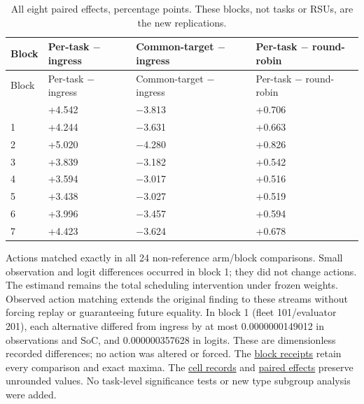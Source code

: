 \documentclass[12pt,a4paper]{article}
\begin{document}
\begingroup
\singlespacing\footnotesize\setlength{\tabcolsep}{3pt}
\renewcommand{\thetable}{E2}
\begin{xltabular}{\textwidth}{@{}YYYY@{}}
\caption[Eight paired effects]{All eight paired effects, percentage points. These blocks, not tasks or RSUs, are the new replications.}\label{tab:E2} \\
\toprule
Block & Per-task \ensuremath{-} ingress & Common-target \ensuremath{-} ingress & Per-task \ensuremath{-} round-robin \\
\midrule\endfirsthead
\toprule
Block & Per-task \ensuremath{-} ingress & Common-target \ensuremath{-} ingress & Per-task \ensuremath{-} round-robin \\
\midrule\endhead
\bottomrule{} & +4.542 & \ensuremath{-}3.813 & +0.706 \\
1 & +4.244 & \ensuremath{-}3.631 & +0.663 \\
2 & +5.020 & \ensuremath{-}4.280 & +0.826 \\
3 & +3.839 & \ensuremath{-}3.182 & +0.542 \\
4 & +3.594 & \ensuremath{-}3.017 & +0.516 \\
5 & +3.438 & \ensuremath{-}3.027 & +0.519 \\
6 & +3.996 & \ensuremath{-}3.457 & +0.594 \\
7 & +4.423 & \ensuremath{-}3.624 & +0.678 \\
\end{xltabular}
\endgroup

Actions matched exactly in all 24 non-reference arm/block comparisons. Small observation and logit differences occurred in block 1; they did not change actions. The estimand remains the total scheduling intervention under frozen weights. Observed action matching extends the original finding to these streams without forcing replay or guaranteeing future equality. In block 1 (fleet 101/evaluator 201), each alternative differed from ingress by at most 0.0000000149012 in observations and SoC, and 0.000000357628 in logits. These are dimensionless recorded differences; no action was altered or forced. The \href{\detokenize{../joint_confirmation_2026-09-08/evidence/BLOCK_CONTROLS.json}}{block receipts} retain every comparison and exact maxima. The \href{\detokenize{../joint_confirmation_2026-09-08/evidence/CELL_RESULTS.json}}{cell records} and \href{\detokenize{../joint_confirmation_2026-09-08/evidence/PAIRED_EFFECTS.csv}}{paired effects} preserve unrounded values. No task-level significance tests or new type subgroup analysis were added.
\end{document}
